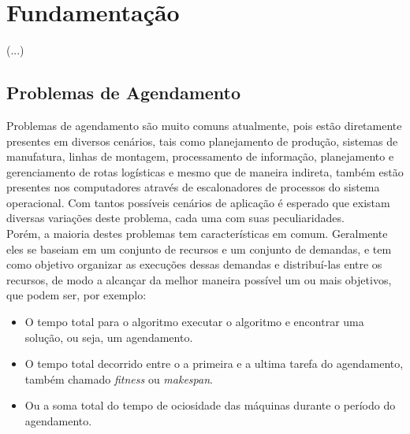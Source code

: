 \chapter{Fundamentação}
(...)

\section{Problemas de Agendamento}
Problemas de agendamento são muito comuns atualmente, pois estão diretamente presentes em diversos cenários, tais como planejamento de produção, sistemas de manufatura, linhas de montagem, processamento de informação, planejamento e gerenciamento de rotas logísticas e mesmo que de maneira indireta, também estão presentes nos computadores através de escalonadores de processos do sistema operacional.
%
Com tantos possíveis cenários de aplicação é esperado que existam diversas variações deste problema, cada uma com suas peculiaridades.\\
%
\indent Porém, a maioria destes problemas tem características em comum. Geralmente eles se baseiam em um conjunto de recursos e um conjunto de demandas, e tem como objetivo organizar as execuções dessas demandas e distribuí-las entre os recursos, de modo a alcançar da melhor maneira possível um ou mais objetivos, que podem ser, por exemplo: 
\begin{itemize}
    \item O tempo total para o algoritmo executar o algoritmo e encontrar uma solução, ou seja, um agendamento.
    \item O tempo total decorrido entre o a primeira e a ultima tarefa do agendamento, também chamado \textit{fitness} ou \textit{makespan}.
    \item Ou a soma total do tempo de ociosidade das máquinas durante o período do agendamento.
\end{itemize}

